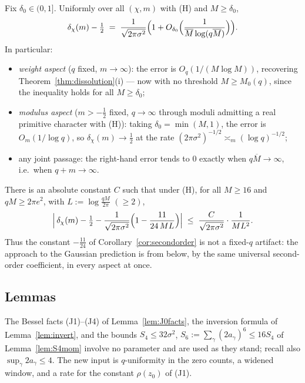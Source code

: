 \begin{corollary}\label{cor:joint-asymp}
Fix $\delta_0\in(0,1]$. Uniformly over all $(\chi,m)$ with (H) and
$M\ge\delta_0$,
\[
\delta_\chi(m)-\tfrac12
\;=\;\frac{1}{\sqrt{2\pi\sigma^{2}}}
\Bigl(1+O_{\delta_0}\Bigl(
\frac{1}{\overline M\log(q\overline M)}\Bigr)\Bigr).
\]
In particular:
\begin{itemize}
\item[(a)] \emph{weight aspect} ($q$ fixed, $m\to\infty$): the error is
$O_q(1/(M\log M))$, recovering Theorem~\ref{thm:dissolution}(i) ---
now with no threshold $M\ge M_0(q)$, since the inequality holds for
all $M\ge\delta_0$;
\item[(b)] \emph{modulus aspect} ($m>-\tfrac12$ fixed, $q\to\infty$
through moduli admitting a real primitive character with (H)): taking
$\delta_0=\min(M,1)$, the error is $O_m(1/\log q)$, so
$\delta_\chi(m)\to\tfrac12$ at the rate $(2\pi\sigma^2)^{-1/2}
\asymp_m(\log q)^{-1/2}$;
\item[(c)] any joint passage: the right-hand error tends to $0$
exactly when $q\overline M\to\infty$, i.e.\ when $q+m\to\infty$.
\end{itemize}
\end{corollary}

\begin{corollary}\label{cor:joint-second}
There is an absolute constant $C$ such that under (H), for all
$M\ge16$ and $qM\ge2\pi e^{2}$, with $L:=\log\tfrac{qM}{2\pi}$
$(\ge2)$,
\[
\Bigl|\,\delta_\chi(m)-\tfrac12
-\frac{1}{\sqrt{2\pi\sigma^{2}}}
\Bigl(1-\frac{11}{24\,ML}\Bigr)\Bigr|
\;\le\;\frac{C}{\sqrt{2\pi\sigma^{2}}}\cdot\frac{1}{ML^{2}} .
\]
Thus the constant $-\tfrac{11}{24}$ of Corollary~\ref{cor:secondorder}
is not a fixed-$q$ artifact: the approach to the Gaussian prediction is
from below, by the same universal second-order coefficient, in every
aspect at once.
\end{corollary}

\subsection*{Lemmas}

The Bessel facts (J1)--(J4) of Lemma~\ref{lem:J0facts}, the inversion
formula of Lemma~\ref{lem:invert}, and the bounds
$S_4\le32\sigma^2$, $S_6:=\sum_\gamma(2a_\gamma)^6\le16S_4$ of
Lemma~\ref{lem:S4mom} involve no parameter and are used as they stand;
recall also $\sup_\gamma 2a_\gamma\le4$. The new input is
$q$-uniformity in the zero counts, a widened window, and a rate for
the constant $\rho(z_0)$ of (J1).

